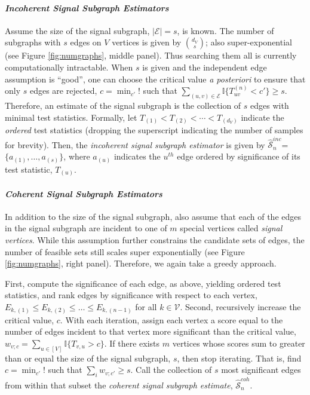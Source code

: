 \documentclass[10pt,journal,cspaper,compsoc]{IEEEtran}
\newcommand{\II}{\mathbb{I}}           %
\providecommand{\mc}[1]{\mathcal{#1}}
\providecommand{\mhc}[1]{\hat{\mathcal{#1}}}
\begin{document}
\paragraph{\emph{Incoherent Signal Subgraph Estimators}} %
\label{par:paragraph_name}


Assume the size of the signal subgraph, $|\mc{E}|=s$, is known.  The number of subgraphs with $s$ edges on $V$ vertices is given by $\binom{d_V}{s}$; also super-exponential (see Figure \ref{fig:numgraphs}, middle panel). Thus searching them all is currently computationally intractable.  When $s$ is given and the independent edge assumption is ``good'', one can choose the critical value \emph{a posteriori} to ensure that only $s$ edges are rejected, $c = \min_{c'}!$ such that $\sum_{(u,v) \in \mc{E}} \II \{T_{uv}^{(n)} < c'\} \geq s$.  Therefore, an estimate of the signal subgraph is the collection of $s$ edges with minimal test statistics.  Formally, let $T_{(1)} < T_{(2)} < \cdots < T_{(d_V)}$ indicate the \emph{ordered} test statistics (dropping the superscript indicating the number of samples for brevity).  Then, the \emph{incoherent signal subgraph estimator} is given by $\mhc{S}^{inc}_n$=$\{a_{(1)}, \ldots, a_{(s)}\}$, where $a_{(u)}$ indicates the $u^{th}$ edge ordered by significance of its test statistic, $T_{(u)}$.  %

\paragraph{\emph{Coherent Signal Subgraph Estimators}}

In addition to the size of the signal subgraph, also assume that each of the edges in the signal subgraph are incident to one of $m$ special vertices called \emph{signal vertices}. While this assumption further constrains the candidate sets of edges, the number of feasible sets still scales super exponentially (see Figure \ref{fig:numgraphs}, right panel).  Therefore, we again take a greedy approach.  

First, compute the significance of each edge, as above, yielding ordered test statistics, and rank edges by significance with respect to each vertex,  $E_{k,(1)} \leq E_{k,(2)} \leq \ldots \leq E_{k,(n-1)}$ for all $k \in \mc{V}$.  Second, recursively increase the critical value, $c$. With each iteration, assign each vertex a score equal to the number of edges incident to that vertex more significant than the critical value, $w_{v;c}=\sum_{u \in [V]} \II\{T_{v,u} > c\}$.  If there exists $m$ vertices whose scores sum to greater than or equal the size of the signal subgraph, $s$, then stop iterating.  That is, find $c=\min_{c'} !$ such that $\sum_{i} w_{v;c'}\geq s$.  Call the collection of $s$ most significant edges from within that subset the \emph{coherent signal subgraph estimate}, $\mhc{S}^{coh}_n$. %
\end{document}
